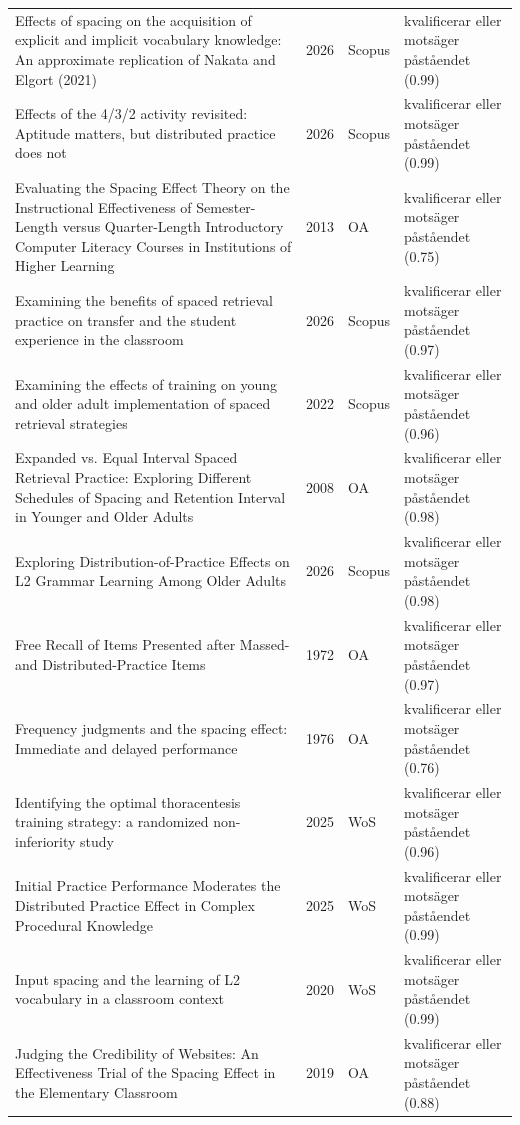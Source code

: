 \begin{longtable}{@{}%
  >{\raggedright\arraybackslash}p{}c%
  >{\raggedright\arraybackslash}p{}%
  >{\raggedright\arraybackslash}p{}@{}}
Effects of spacing on the acquisition of explicit and implicit vocabulary knowledge: An approximate replication of Nakata and Elgort (2021) & 2026 & Scopus & kvalificerar eller motsäger påståendet (0.99) \\
Effects of the 4/3/2 activity revisited: Aptitude matters, but distributed practice does not & 2026 & Scopus & kvalificerar eller motsäger påståendet (0.99) \\
Evaluating the Spacing Effect Theory on the Instructional Effectiveness of Semester-Length versus Quarter-Length Introductory Computer Literacy Courses in Institutions of Higher Learning & 2013 & OA & kvalificerar eller motsäger påståendet (0.75) \\
Examining the benefits of spaced retrieval practice on transfer and the student experience in the classroom & 2026 & Scopus & kvalificerar eller motsäger påståendet (0.97) \\
Examining the effects of training on young and older adult implementation of spaced retrieval strategies & 2022 & Scopus & kvalificerar eller motsäger påståendet (0.96) \\
Expanded vs. Equal Interval Spaced Retrieval Practice: Exploring Different Schedules of Spacing and Retention Interval in Younger and Older Adults & 2008 & OA & kvalificerar eller motsäger påståendet (0.98) \\
Exploring Distribution-of-Practice Effects on L2 Grammar Learning Among Older Adults & 2026 & Scopus & kvalificerar eller motsäger påståendet (0.98) \\
Free Recall of Items Presented after Massed- and Distributed-Practice Items & 1972 & OA & kvalificerar eller motsäger påståendet (0.97) \\
Frequency judgments and the spacing effect: Immediate and delayed performance & 1976 & OA & kvalificerar eller motsäger påståendet (0.76) \\
Identifying the optimal thoracentesis training strategy: a randomized non-inferiority study & 2025 & WoS & kvalificerar eller motsäger påståendet (0.96) \\
Initial Practice Performance Moderates the Distributed Practice Effect in Complex Procedural Knowledge & 2025 & WoS & kvalificerar eller motsäger påståendet (0.99) \\
Input spacing and the learning of L2 vocabulary in a classroom context & 2020 & WoS & kvalificerar eller motsäger påståendet (0.99) \\
Judging the Credibility of Websites: An Effectiveness Trial of the Spacing Effect in the Elementary Classroom & 2019 & OA & kvalificerar eller motsäger påståendet (0.88) \\

\end{longtable}
